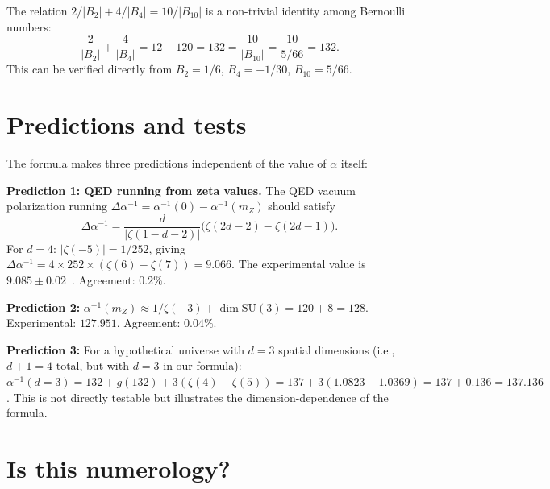 \documentclass[11pt,a4paper]{article}
\begin{document}
The relation $2/|B_2| + 4/|B_4| = 10/|B_{10}|$ is a
non-trivial identity among Bernoulli numbers:
\begin{equation}
  \frac{2}{|B_2|} + \frac{4}{|B_4|} = 12 + 120 = 132
  = \frac{10}{|B_{10}|} = \frac{10}{5/66} = 132.
  \label{eq:bernoulli_id}
\end{equation}
This can be verified directly from $B_2 = 1/6$,
$B_4 = -1/30$, $B_{10} = 5/66$.

\section{Predictions and tests}
\label{sec:predictions}

The formula makes three predictions independent of the
value of $\alpha$ itself:

\textbf{Prediction 1: QED running from zeta values.}
The QED vacuum polarization running
$\Delta\alpha^{-1} = \alpha^{-1}(0) - \alpha^{-1}(m_Z)$
should satisfy
\begin{equation}
  \Delta\alpha^{-1} = \frac{d}{|\zeta(1{-}d{-}2)|}
  \bigl(\zeta(2d{-}2) - \zeta(2d{-}1)\bigr).
  \label{eq:running_pred}
\end{equation}
For $d = 4$: $|\zeta(-5)| = 1/252$, giving
$\Delta\alpha^{-1} = 4 \times 252 \times (\zeta(6) - \zeta(7))
= 9.066$.
The experimental value is $9.085 \pm 0.02$~\cite{Jegerlehner2011}.
Agreement: $0.2\%$.

\textbf{Prediction 2:} $\alpha^{-1}(m_Z) \approx 1/\zeta(-3) + \dim\mathrm{SU}(3)
= 120 + 8 = 128$. Experimental: $127.951$.
Agreement: $0.04\%$.

\textbf{Prediction 3:} For a hypothetical universe with $d = 3$
spatial dimensions (i.e., $d + 1 = 4$ total, but with $d = 3$
in our formula):
$\alpha^{-1}(d{=}3) = 132 + g(132) + 3(\zeta(4) - \zeta(5))
= 137 + 3(1.0823 - 1.0369) = 137 + 0.136 = 137.136$.
This is not directly testable but illustrates the
dimension-dependence of the formula.

\section{Is this numerology?}
\label{sec:numerology}
\end{document}
